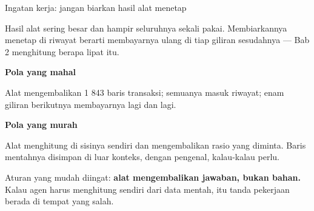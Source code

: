 \documentclass[aspectratio=169,11pt,t]{beamer}
\begin{document}
\begin{frame}[shrink=25]{Ingatan kerja: jangan biarkan hasil alat menetap}
{\fontsize{9.4}{12.6}\selectfont\color{fg2}Hasil alat sering besar dan hampir seluruhnya sekali pakai. Membiarkannya menetap di riwayat berarti membayarnya ulang di tiap giliran sesudahnya --- Bab 2 menghitung berapa lipat itu.\par}\vskip 4pt
\begin{minipage}[t]{0.485\textwidth}
{\fontsize{9.4}{12.6}\selectfont\color{fg2}\textbf{Pola yang mahal}\par}\vskip 4pt
{\fontsize{9.4}{12.6}\selectfont\color{fg2}Alat mengembalikan 1 843 baris transaksi; semuanya masuk riwayat; enam giliran berikutnya membayarnya lagi dan lagi.\par}\vskip 4pt

\end{minipage}%
\hfill
\begin{minipage}[t]{0.485\textwidth}
{\fontsize{9.4}{12.6}\selectfont\color{fg2}\textbf{Pola yang murah}\par}\vskip 4pt
{\fontsize{9.4}{12.6}\selectfont\color{fg2}Alat menghitung di sisinya sendiri dan mengembalikan rasio yang diminta. Baris mentahnya disimpan di luar konteks, dengan pengenal, kalau-kalau perlu.\par}\vskip 4pt

\end{minipage}%
\begin{iband}[signal]
Aturan yang mudah diingat: \textbf{alat mengembalikan jawaban, bukan bahan.} Kalau agen harus menghitung sendiri dari data mentah, itu tanda pekerjaan berada di tempat yang salah.
\end{iband}
\end{frame}
\end{document}

